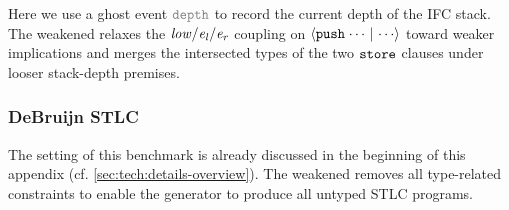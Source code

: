 \vspace{-.4cm}\par\nobreak\noindent
Here we use a ghost event $\effGray{depth}$ to record the current depth of the IFC stack.
The weakened \tyName{} relaxes the \(\mathit{low}/\mathit{e_l}/\mathit{e_r}\) coupling on \({\langle} {\boldsymbol{{\tt push}}\;{\cdots} ~|~ {\cdots}} {\rangle}\) toward weaker implications and merges the intersected types of the two \(\boldsymbol{{\tt store}}\) clauses under looser stack-depth premises.

\subsubsection*{DeBruijn STLC} The setting of this benchmark is already discussed in the beginning of this appendix (cf. \autoref{sec:tech:details-overview}). The weakened \tyName{} removes all type-related constraints to enable the generator to produce all untyped STLC programs.

\newpage

